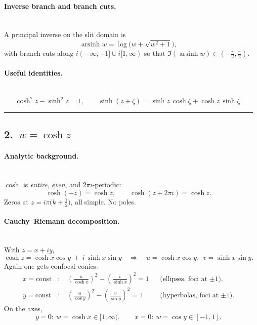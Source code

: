 \documentclass[11pt]{article}
\begin{document}
\medskip

\paragraph{Inverse branch and branch cuts.}\mbox{}\\[2pt]
A principal inverse on the slit domain is
\[
\operatorname{arsinh} w=\log\!\big(w+\sqrt{w^{2}+1}\big),
\]
with branch cuts along $i(-\infty,-1]\cup i[1,\infty)$ so that $\Im(\operatorname{arsinh} w)\in(-\tfrac{\pi}{2},\tfrac{\pi}{2})$.

\medskip

\paragraph{Useful identities.}\mbox{}\\[2pt]
\[
\cosh^{2}z-\sinh^{2}z=1,\qquad
\sinh(z+\zeta)=\sinh z\,\cosh\zeta+\cosh z\,\sinh\zeta.
\]

\bigskip\hrule\bigskip

\subsection*{2.\ $w=\cosh z$}

\paragraph{Analytic background.}\mbox{}\\[2pt]
$\cosh$ is \emph{entire}, \emph{even}, and $2\pi i$-periodic:
\[
\cosh(-z)=\cosh z,\qquad \cosh(z+2\pi i)=\cosh z.
\]
Zeros at $z=i\pi\big(k+\tfrac12\big)$, all simple. No poles.

\medskip

\paragraph{Cauchy--Riemann decomposition.}\mbox{}\\[2pt]
With $z=x+iy$,
\[
\cosh z=\cosh x\cos y\ +\ i\,\sinh x\sin y \quad\Rightarrow\quad
u=\cosh x\cos y,\ \ v=\sinh x\sin y.
\]
Again one gets confocal conics:
\begin{align*}
	x=\text{const}&:\quad \left(\frac{u}{\cosh x}\right)^{2}+\left(\frac{v}{\sinh x}\right)^{2}=1
	&&\text{(ellipses, foci at $\pm1$)},\\[2pt]
	y=\text{const}&:\quad \left(\frac{u}{\cos y}\right)^{2}-\left(\frac{v}{\sin y}\right)^{2}=1
	&&\text{(hyperbolas, foci at $\pm1$)}.
\end{align*}
On the axes,
\[
y=0:\ w=\cosh x\in[1,\infty),\qquad
x=0:\ w=\cos y\in[-1,1].
\]
\end{document}
